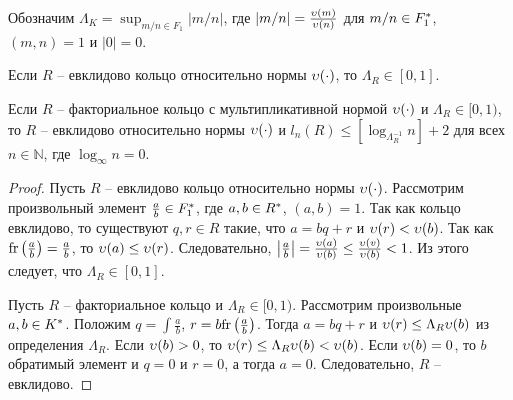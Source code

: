 \documentclass[_00_dissertation.tex]{subfiles}
\begin{document}
\begin{definition}\label{definition:euclidean_lambda}
    Обозначим $\Lambda_K = \sup_{m/n \in F_1} |m/n|$, где $|m/n| = \frac{\upsilon(m)}{\upsilon(n)}$ для $m/n \in F_1^{*}$, $(m, n) = 1$ и $|0| = 0$.
\end{definition}

\begin{theorem}\label{theorem:euclidean_and_lambda}
    Если $R$ -- евклидово кольцо относительно нормы $\upsilon(\cdot)$, то $\Lambda_R \in [0, 1]$.

    Если $R$ -- факториальное кольцо с мультипликативной нормой $\upsilon(\cdot)$ и $\Lambda_R \in [0, 1)$, то $R$ -- евклидово относительно нормы $\upsilon(\cdot)$ и $l_n(R) \le [\log_{\Lambda_R^{-1}} n] + 2$ для всех $n \in \mathbb{N}$, где $\log_{\infty} n = 0$.
\end{theorem}
\begin{proof}
    Пусть $R$ -- евклидово кольцо относительно нормы $\upsilon(\cdot)$.
    Рассмотрим произвольный элемент $\frac{a}{b} \in F_1^{*}$, где $a, b \in R^{*}$, $(a, b) = 1$.
    Так как кольцо евклидово, то существуют $q, r \in R$ такие, что $a = bq + r$ и $\upsilon(r) < \upsilon(b)$.
    Так как $\textrm{fr}\left(\frac{a}{b}\right) = \frac{a}{b}$, то $\upsilon(a) \le \upsilon(r)$.
    Следовательно, $\left|\frac{a}{b}\right| = \frac{\upsilon(a)}{\upsilon(b)} \le \frac{\upsilon(v)}{\upsilon(b)} < 1$.
    Из этого следует, что $\Lambda_R \in [0, 1]$.

    Пусть $R$ -- факториальное кольцо и $\Lambda_R \in [0, 1)$.
    Рассмотрим произвольные $a, b \in K^{*}$.
    Положим $q = \int{\frac{a}{b}}$, $r = b\textrm{fr}\left(\frac{a}{b}\right)$.
    Тогда $a = bq + r$ и $\upsilon(r) \le \Lambda_R \upsilon(b)$ из определения $\Lambda_R$.
    Если $\upsilon(b) > 0$, то $\upsilon(r) \le \Lambda_R \upsilon(b) < \upsilon(b)$.
    Если $\upsilon(b) = 0$, то $b$ обратимый элемент и $q = 0$ и $r = 0$, а тогда $a = 0$.
    Следовательно, $R$ -- евклидово.
\end{proof}
\end{document}
